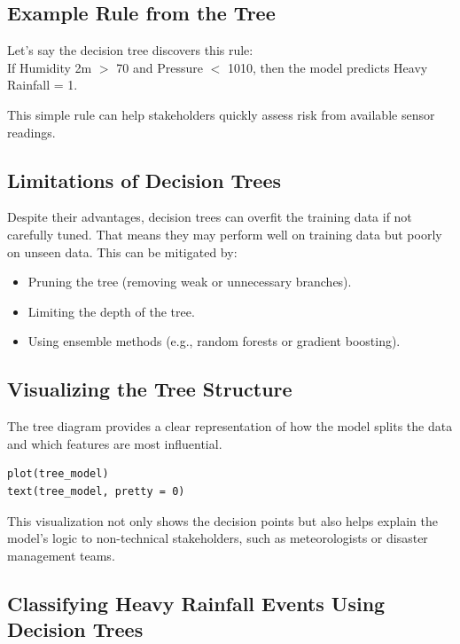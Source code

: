 \subsection*{Example Rule from the Tree}

Let’s say the decision tree discovers this rule: \\
If Humidity 2m $>$ 70 and Pressure $<$ 1010, then the model predicts Heavy Rainfall = 1.

This simple rule can help stakeholders quickly assess risk from available sensor readings.

\subsection*{Limitations of Decision Trees}

Despite their advantages, decision trees can overfit the training data if not carefully tuned. That means they may perform well on training data but poorly on unseen data. This can be mitigated by:

\begin{itemize}
  \item Pruning the tree (removing weak or unnecessary branches).
  \item Limiting the depth of the tree.
  \item Using ensemble methods (e.g., random forests or gradient boosting).
\end{itemize}

\subsection*{Visualizing the Tree Structure}

The tree diagram provides a clear representation of how the model splits the data and which features are most influential.

\begin{verbatim}
plot(tree_model)
text(tree_model, pretty = 0)
\end{verbatim}

This visualization not only shows the decision points but also helps explain the model’s logic to non-technical stakeholders, such as meteorologists or disaster management teams.

\subsection*{Classifying Heavy Rainfall Events Using Decision Trees}

